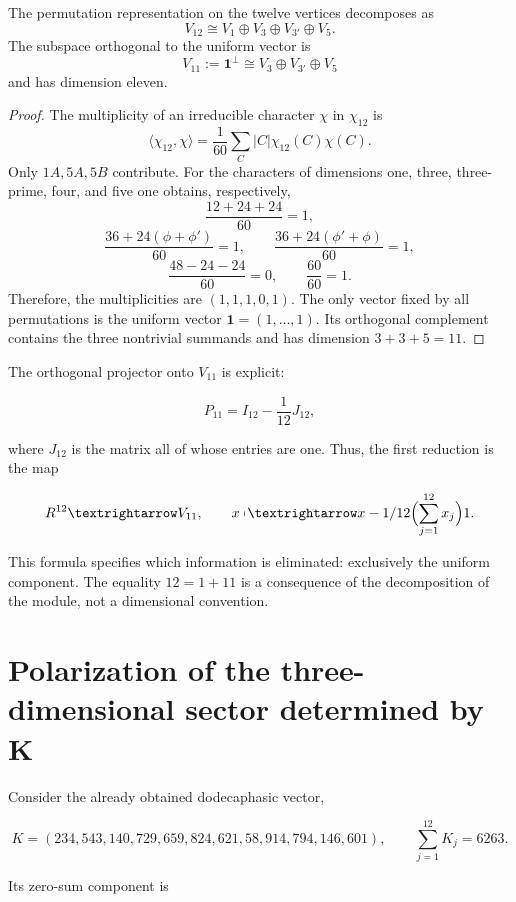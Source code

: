 \begin{theorem}
\label{thm:descomposicion-a5}
The permutation representation on the twelve vertices decomposes as
\[
V_{12}\cong V_1\oplus V_3\oplus V_{3'}\oplus V_5.
\]
The subspace orthogonal to the uniform vector is
\[
V_{11}:=\mathbf1^\perp
\cong V_3\oplus V_{3'}\oplus V_5
\]
and has dimension eleven.
\end{theorem}

\begin{proof}
The multiplicity of an irreducible character \(\chi\) in \(\chi_{12}\) is
\[
\langle\chi_{12},\chi\rangle
=\frac1{60}\sum_C|C|\chi_{12}(C)\chi(C).
\]
Only \(1A,5A,5B\) contribute. For the characters of dimensions one, three,
three-prime, four, and five one obtains, respectively,
\[
\frac{12+24+24}{60}=1,
\]
\[
\frac{36+24(\phi+\phi')}{60}=1,
\qquad
\frac{36+24(\phi'+\phi)}{60}=1,
\]
\[
\frac{48-24-24}{60}=0,
\qquad
\frac{60}{60}=1.
\]
Therefore, the multiplicities are \((1,1,1,0,1)\). The only vector fixed by
all permutations is the uniform vector
\(\mathbf1=(1,\ldots,1)\). Its orthogonal complement contains the three
nontrivial summands and has dimension \(3+3+5=11\).
\end{proof}

The orthogonal projector onto \(V_{11}\) is explicit:

\[
P_{11}=I_{12}-\frac1{12}J_{12},
\]

where \(J_{12}\) is the matrix all of whose entries are one. Thus, the first
reduction is the map

\[
\mathbb R^{12}\longrightarrow V_{11},
\qquad
x\longmapsto x-\frac1{12}\Bigl(\sum_{j=1}^{12}x_j\Bigr)\mathbf1.
\]

This formula specifies which information is eliminated: exclusively the
uniform component. The equality \(12=1+11\) is a consequence of the
decomposition of the module, not a dimensional convention.

\section[Polarization of the three-dimensional sector]{Polarization of the three-dimensional sector determined by K}
\label{sec:reduccion-once-diez}

Consider the already obtained dodecaphasic vector,

\[
K=(234,543,140,729,659,824,621,58,914,794,146,601),
\qquad
\sum_{j=1}^{12}K_j=6263.
\]

Its zero-sum component is

